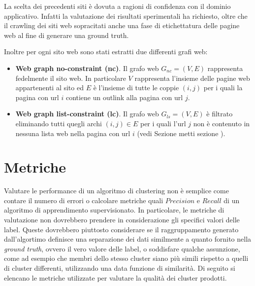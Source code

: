La scelta dei precedenti siti è dovuta a ragioni di confidenza con il dominio applicativo. Infatti la valutazione dei risultati sperimentali ha richiesto, oltre che il crawling dei siti web sopracitati anche una fase di etichettatura delle pagine web al fine di generare una ground truth.

Inoltre per ogni sito web sono stati estratti due differenti grafi web:
\begin{itemize}
\item \textbf{Web graph no-constraint (nc)}. Il grafo web $G_{nc}=(V,E)$ rappresenta fedelmente il sito web. In particolare $V$ rappresenta l'insieme delle pagine web appartenenti al sito ed $E$ è l'insieme di tutte le coppie $(i,j)$ per i quali la pagina con url $i$ contiene un outlink alla pagina con url $j$.
\item \textbf{Web graph list-constraint (lc)}. Il grafo web $G_{ls}=(V,E)$ è filtrato eliminando tutti quegli archi $(i,j) \in E$ per i quali l'url $j$ non è contenuto in nessuna lista web nella pagina con url $i$ (vedi Sezione \color{red} metti sezione \color{black}).
\end{itemize}



\section{Metriche}
Valutare le performance di un algoritmo di clustering non è semplice come contare il numero di errori o calcolare metriche quali $Precision$ e $Recall$ di un algoritmo di apprendimento supervisionato. In particolare, le metriche di valutazione non dovrebbero prendere in considerazione gli specifici valori delle label. Queste dovrebbero piuttosto considerare se il raggruppamento generato dall'algortimo definisce una separazione dei dati similmente a quanto fornito nella \textit{ground truth}, ovvero il vero valore delle label, o soddisfare qualche assunzione, come ad esempio che membri dello stesso cluster siano più simili rispetto a quelli di cluster differenti, utilizzando una data funzione di similarità. Di seguito si elencano le metriche utilizzate per valutare la qualità dei cluster prodotti.

